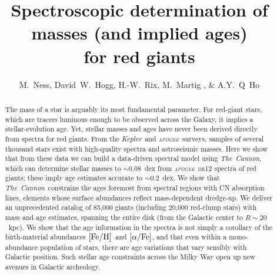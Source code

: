 \documentclass[12pt, preprint]{aastex}
\newcommand{\project}[1]{\textsl{#1}}
\newcommand{\tc}{\project{The~Cannon}}
\newcommand{\apogee}{\project{\textsc{apogee}}}
\newcommand{\kepler}{\project{Kepler}}
\newcommand{\feh}{\mbox{$\rm [Fe/H]$}}
\newcommand{\alphafe}{\mbox{$\rm [\alpha/Fe]$}}
\begin{document}

\title{Spectroscopic determination of masses (and implied ages) \\for red giants}
\author{M.~Ness,
        David~W.~Hogg,
        H.-W.~Rix,
        M.~Martig , \&
        A.Y.~Q~Ho }

\begin{abstract}%
The mass of a star is arguably its most fundamental parameter.
For red-giant stars, which are tracers luminous enough to be observed
across the Galaxy, it implies a stellar-evolution age.
Yet, stellar masses and ages have never been derived directly from
spectra for red giants.
From the \kepler\ and \apogee\ surveys, samples of several thousand
stars exist with high-quality spectra and astroseismic masses.
Here we show that from these data we can build a data-driven spectral
model using \tc, which can determine stellar masses to $\sim 0.08$~dex
from \apogee\ \textsc{dr12} spectra of red giants; these imply age
estimates accurate to $\sim 0.2$~dex.
We show that \tc\ constrains the ages foremost from spectral regions
with CN absorption lines, elements whose surface abundances reflect
mass-dependent dredge-up.
We deliver an unprecedented catalog of 85,000 giants (including 20,000
red-clump stars) with mass and age estimates, spanning the entire disk
(from the Galactic center to $R\sim 20$~kpc).
We show that the age information in the spectra is not simply a
corollary of the birth-material abundances \feh\ and \alphafe, and
that even within a mono-abundance population of stars, there are age
variations that vary sensibly with Galactic position.
Such stellar age constraints across the Milky Way open up new avenues
in Galactic archeology.
\end{abstract}
\end{document}
